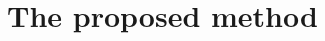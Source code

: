 \documentclass[5p, final]{elsarticle}
\begin{document}


\section{The proposed method}
\label{sec:individual}
\end{document}
